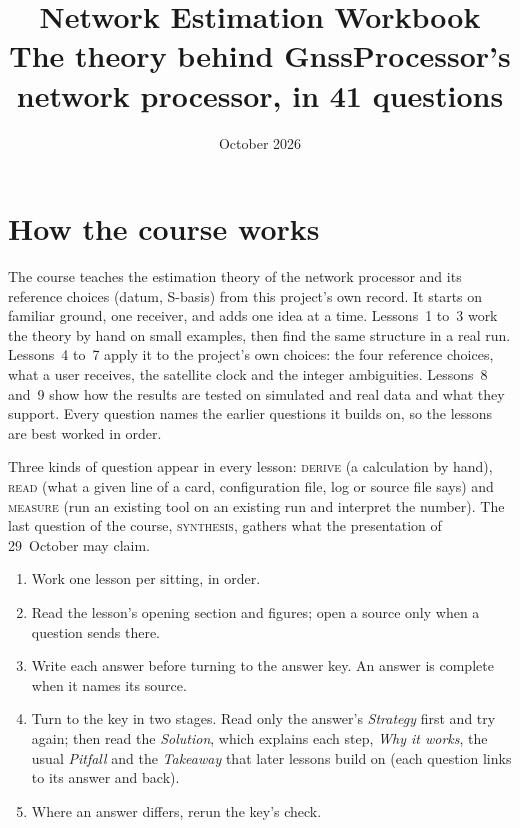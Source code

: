 \documentclass[11pt,letterpaper]{article}
\title{\bfseries Network Estimation Workbook\\[4pt]
  \large The theory behind GnssProcessor's network processor, in 41 questions}
\author{}
\date{October 2026}
\newcounter{question}[section]
\begin{document}
\maketitle
\tableofcontents

\section*{How the course works}

The course teaches the estimation theory of the network processor and its
reference choices (datum, S-basis) from this project's own record. It starts on
familiar ground, one receiver, and adds one idea at a time. Lessons~1 to~3 work
the theory by hand on small examples, then find the same structure in a real
run. Lessons~4 to~7 apply it to the project's own choices: the four reference
choices, what a user receives, the satellite clock and the integer ambiguities.
Lessons~8 and~9 show how the results are tested on simulated and real data and
what they support. Every question names the earlier questions it builds on, so
the lessons are best worked in order.

Three kinds of question appear in every lesson: \textsc{derive} (a calculation
by hand), \textsc{read} (what a given line of a card, configuration file, log or
source file says) and \textsc{measure} (run an existing tool on an existing run
and interpret the number). The last question of the course,
\textsc{synthesis}, gathers what the presentation of 29~October may claim.

\begin{enumerate}[leftmargin=*, itemsep=1pt]
\item Work one lesson per sitting, in order.
\item Read the lesson's opening section and figures; open a source only when a
      question sends there.
\item Write each answer before turning to the answer key. An answer is complete
      when it names its source.
\item Turn to the key in two stages. Read only the answer's \emph{Strategy}
      first and try again; then read the \emph{Solution}, which explains each
      step, \emph{Why it works}, the usual \emph{Pitfall} and the
      \emph{Takeaway} that later lessons build on (each question links to its
      answer and back).
\item Where an answer differs, rerun the key's check.
\end{enumerate}
\end{document}
